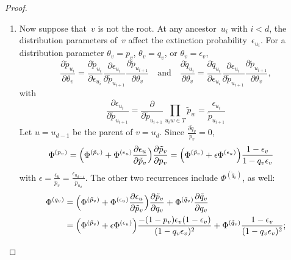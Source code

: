 \documentclass{elsarticle}
\newcommand{\nx}{u}
\newcommand{\ny}{v}
\newcommand{\nz}{w}
\newcommand{\fdf}{\Phi}
\begin{document}
\begin{proof}
\begin{enumerate}[label=(\roman*)]
\item Now suppose that~$\ny$ is not the root. 
At any ancestor~$\nx_i$ with $i<d$, the distribution parameters of~$\ny$ 
affect the extinction probability~$\epsilon_{\nx_i}$. For 
a distribution parameter $\theta_{\ny}=p_{\ny}$, $\theta_{\ny}=q_{\ny}$, 
or $\theta_v=\epsilon_v$, 
\[
\frac{\partial \tilde{p}_{\nx_i}}{\partial \theta_{\ny}} = 
\frac{\partial \tilde{p}_{\nx_i}}{\partial \epsilon_{\nx_i}} %
\frac{\partial \epsilon_{\nx_i}}{\partial \tilde{p}_{\nx_{i+1}}}
\frac{\partial \tilde{p}_{\nx_{i+1}}}{\partial \theta_{\ny}}
\quad\text{and}\quad
\frac{\partial \tilde{q}_{\nx_i}}{\partial \theta_{\ny}} = 
\frac{\partial \tilde{q}_{\nx_i}}{\partial \epsilon_{\nx_i}} %
\frac{\partial \epsilon_{\nx_i}}{\partial \tilde{p}_{\nx_{i+1}}}
	\frac{\partial \tilde{p}_{\nx_{i+1}}}{\partial \theta_{\ny}},
\]
with 
\[
\frac{\partial \epsilon_{\nx_i}}{\partial \tilde{p}_{\nx_{i+1}}}
= \frac{\partial }{\partial \tilde{p}_{\nx_{i+1}}} \prod_{\nx_i\nz\in T} \tilde{p}_{\nz}
= \frac{\epsilon_{\nx_i}}{\tilde{p}_{\nx_{i+1}}}
\]
Let $\nx=\nx_{d-1}$ be the parent of $\ny=\nx_d$. 
Since $\frac{\partial \tilde{q}_{\ny}}{p_{\ny}}=0$, 
\begin{align*}
\fdf^{(p_{\ny})}
& = \Bigl(\fdf^{(\tilde{p}_{\ny})} 
	+ \fdf^{(\epsilon_{\nx})}
	 \frac{\partial \epsilon_{\nx}}{\partial \tilde{p}_{\ny}}\Bigr)
	 \frac{\partial \tilde{p}_{\ny}}{\partial p_{\ny}}
= \Bigl(\fdf^{(\tilde{p}_{\ny})}  
	+ \epsilon \fdf^{(\epsilon_{\nx})}\Bigr)
	\frac{1-\epsilon_{\ny}}{1-q_{\ny}\epsilon_{\ny}}
\end{align*}
with $\epsilon = \frac{\epsilon_{\nx}}{\tilde{p}_{\ny}}=\frac{\epsilon_{\nx_{d-1}}}{\tilde{p}_{\nx_d}}$.
The other two recurrences include $\fdf^{(\tilde{q}_{\ny})}$, as well:
\begin{align*} 
\fdf^{(q_{\ny})}
& = \Bigl(\fdf^{(\tilde{p}_{\ny})} 
	+ \fdf^{(\epsilon_{\nx})}
	 \frac{\partial \epsilon_{\nx}}{\partial \tilde{p}_{\ny}}\Bigr)
	 \frac{\partial \tilde{p}_{\ny}}{\partial q_{\ny}} 
	 +\fdf^{(\tilde{q}_{\ny})} 
		\frac{\partial \tilde{q}_{\ny}}{\partial q_{\ny}}
\\
& =  
		\Bigl(\fdf^{(\tilde{p}_{\ny})} 
		+ \epsilon \fdf^{(\epsilon_{\nx})}\Bigr)
		\frac{-(1-p_{\ny})\epsilon_{\ny}(1-\epsilon_{\ny})}{(1-q_{\ny}\epsilon_{\ny})^2}
	+ \fdf^{(\tilde{q}_{\ny})} 
		\frac{1-\epsilon_{\ny}}{(1-q_{\ny}\epsilon_{\ny})^2};	
\\
%

\end{align*}
\end{enumerate}
\end{proof}
\end{document}
